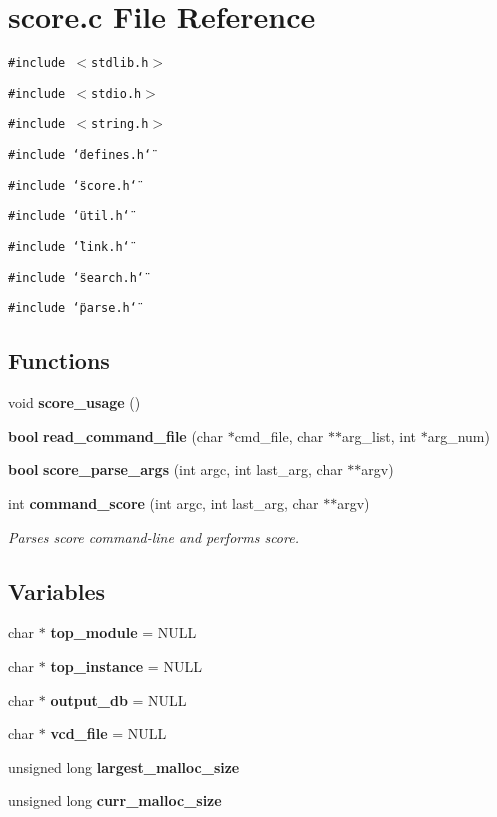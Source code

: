 \section{score.c File Reference}
\label{score_8c}
{\tt \#include $<$stdlib.h$>$}\par
{\tt \#include $<$stdio.h$>$}\par
{\tt \#include $<$string.h$>$}\par
{\tt \#include \char`\"{}defines.h\char`\"{}}\par
{\tt \#include \char`\"{}score.h\char`\"{}}\par
{\tt \#include \char`\"{}util.h\char`\"{}}\par
{\tt \#include \char`\"{}link.h\char`\"{}}\par
{\tt \#include \char`\"{}search.h\char`\"{}}\par
{\tt \#include \char`\"{}parse.h\char`\"{}}\par
\subsection*{Functions}
\begin{CompactItemize}
\item 
void {\bf score\_\-usage} ()
\item 
{\bf bool} {\bf read\_\-command\_\-file} (char $\ast$cmd\_\-file, char $\ast$$\ast$arg\_\-list, int $\ast$arg\_\-num)
\item 
{\bf bool} {\bf score\_\-parse\_\-args} (int argc, int last\_\-arg, char $\ast$$\ast$argv)
\item 
int {\bf command\_\-score} (int argc, int last\_\-arg, char $\ast$$\ast$argv)
\begin{CompactList}\small\item\em Parses score command-line and performs score.\item\end{CompactList}\end{CompactItemize}
\subsection*{Variables}
\begin{CompactItemize}
\item 
char $\ast$ {\bf top\_\-module} = NULL
\item 
char $\ast$ {\bf top\_\-instance} = NULL
\item 
char $\ast$ {\bf output\_\-db} = NULL
\item 
char $\ast$ {\bf vcd\_\-file} = NULL
\item 
unsigned long {\bf largest\_\-malloc\_\-size}
\item 
unsigned long {\bf curr\_\-malloc\_\-size}
\end{CompactItemize}


